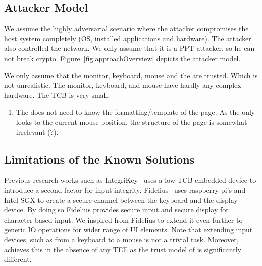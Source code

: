 \subsection{Attacker Model}

We assume the highly adversarial scenario where the attacker compromises the host system completely (OS, installed applications and hardware). The attacker also controlled the network. We only assume that it is a PPT-attacker, so he can not break crypto. Figure~\ref{fig:approachOverview} depicts the attacker model.

We only assume that the monitor, keyboard, mouse and the \device are trusted. Which is not unrealistic. The monitor, keyboard, and mouse have hardly any complex hardware. The TCB is very small.


\begin{enumerate}
  \item The \device does not need to know the formatting/template of the page. As the \device only looks to the current mouse position, the structure of the page is somewhat irrelevant (?).
\end{enumerate}

\subsection{Limitations of the Known Solutions}

Previous research works such as IntegriKey~\cite{IntegriKey} uses a low-TCB embedded device to introduce a second factor for input integrity. Fidelius~\cite{Fidelius} uses raspberry pi's and Intel SGX to create a secure channel between the keyboard and the display device. By doing so Fidelius provides secure input and secure display for character based input. We inspired from Fidelius to extend it even further to generic IO operations for wider range of UI elements. Note that extending input devices, such as from a keyboard to a mouse is not a trivial task. Moreover, \name achieves this in the absence of any TEE as the trust model of \name is significantly different. 




